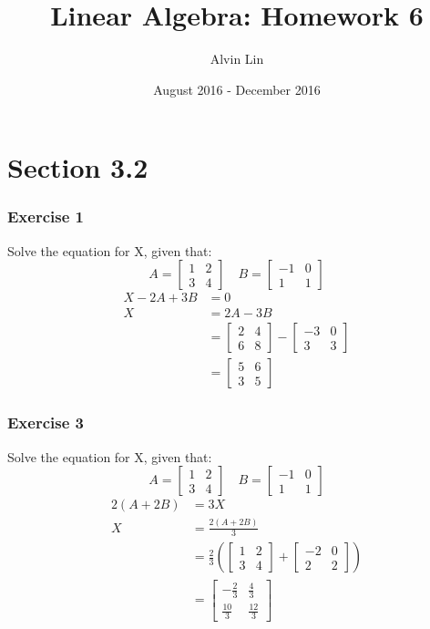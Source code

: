 \documentclass{math}
\title{Linear Algebra: Homework 6}
\author{Alvin Lin}
\date{August 2016 - December 2016}
\begin{document}
\maketitle

\section*{Section 3.2}

\subsubsection*{Exercise 1}
Solve the equation for X, given that:
\[ A = \begin{bmatrix}1 & 2 \\ 3 & 4\end{bmatrix} \quad
  B = \begin{bmatrix}-1 & 0 \\ 1 & 1\end{bmatrix} \]
\begin{align*}
  X-2A+3B &= 0 \\
  X &= 2A-3B \\
  &= \begin{bmatrix}2 & 4 \\ 6 & 8\end{bmatrix}-
    \begin{bmatrix}-3 & 0 \\ 3 & 3\end{bmatrix} \\
  &= \begin{bmatrix}5 & 6 \\ 3 & 5\end{bmatrix}
\end{align*}

\subsubsection*{Exercise 3}
Solve the equation for X, given that:
\[ A = \begin{bmatrix}1 & 2 \\ 3 & 4\end{bmatrix} \quad
  B = \begin{bmatrix}-1 & 0 \\ 1 & 1\end{bmatrix} \]
\begin{align*}
  2(A+2B) &= 3X \\
  X &= \frac{2(A+2B)}{3} \\
  &= \frac{2}{3}\left(\begin{bmatrix}
    1 & 2 \\
    3 & 4
  \end{bmatrix}+\begin{bmatrix}
    -2 & 0 \\
    2 & 2
  \end{bmatrix}\right) \\
  &= \begin{bmatrix}
    -\frac{2}{3} & \frac{4}{3} \\[0.5em]
    \frac{10}{3} & \frac{12}{3}
  \end{bmatrix}
\end{align*}
\end{document}
